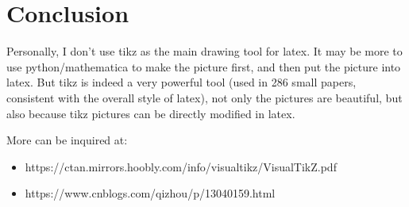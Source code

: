 \documentclass{article}
\begin{document}
\section{Conclusion}
Personally, I don't use tikz as the main drawing tool for latex. It may be more to use python/mathematica to make the picture first, and then put the picture into latex. But tikz is indeed a very powerful tool (used in 286 small papers, consistent with the overall style of latex), not only the pictures are beautiful, but also because tikz pictures can be directly modified in latex.

More can be inquired at:
\begin{itemize}
    \item https://ctan.mirrors.hoobly.com/info/visualtikz/VisualTikZ.pdf
    \item https://www.cnblogs.com/qizhou/p/13040159.html
\end{itemize}
\end{document}
